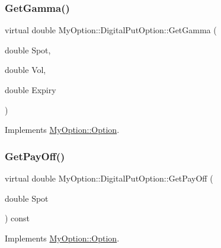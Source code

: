 \hypertarget{classMyOption_1_1DigitalPutOption_a4eeb4d0c53f0075ee80e67270f4bd6a5}{}\label{classMyOption_1_1DigitalPutOption_a4eeb4d0c53f0075ee80e67270f4bd6a5} 
\subsubsection{\texorpdfstring{Get\+Gamma()}{GetGamma()}}
{\footnotesize\ttfamily virtual double My\+Option\+::\+Digital\+Put\+Option\+::\+Get\+Gamma (\begin{DoxyParamCaption}\item[{double}]{Spot,  }\item[{double}]{Vol,  }\item[{double}]{Expiry }\end{DoxyParamCaption})\hspace{0.3cm}{\ttfamily [virtual]}}



Implements \hyperlink{classMyOption_1_1Option_a4416faa432b5004e449394056c7f1363}{My\+Option\+::\+Option}.

\hypertarget{classMyOption_1_1DigitalPutOption_abadcbb78c02b4e6ee22d45da1c72f7b1}{}\label{classMyOption_1_1DigitalPutOption_abadcbb78c02b4e6ee22d45da1c72f7b1} 
\subsubsection{\texorpdfstring{Get\+Pay\+Off()}{GetPayOff()}}
{\footnotesize\ttfamily virtual double My\+Option\+::\+Digital\+Put\+Option\+::\+Get\+Pay\+Off (\begin{DoxyParamCaption}\item[{double}]{Spot }\end{DoxyParamCaption}) const\hspace{0.3cm}{\ttfamily [virtual]}}



Implements \hyperlink{classMyOption_1_1Option_a4b6b84dc485153ffadfb32afa9bb52f3}{My\+Option\+::\+Option}.

\hypertarget{classMyOption_1_1DigitalPutOption_a4f51d8bdbdddfbebf428cea500c5edf0}{}\label{classMyOption_1_1DigitalPutOption_a4f51d8bdbdddfbebf428cea500c5edf0} 
